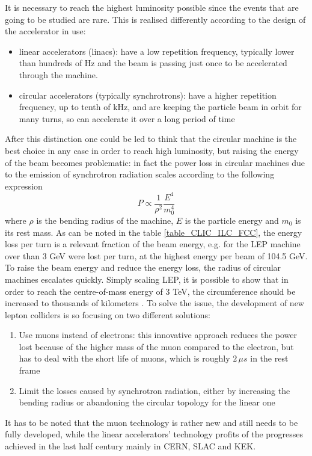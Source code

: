 It is necessary to reach the highest luminosity possible since the events that are going to be studied are rare. This is realised differently according to the design of the accelerator in use:
\begin{itemize}
\item linear accelerators (linacs): have a low repetition frequency, typically lower than hundreds of Hz and the beam is passing just once to be accelerated through the machine.
\item circular accelerators (typically synchrotrons): have a higher repetition frequency, up to tenth of kHz, and are keeping the particle beam in orbit for many turns, so can accelerate it over a long period of time
\end{itemize}
After this distinction one could be led to think that the circular machine is the best choice in any case in order to reach high luminosity, but raising the energy of the beam becomes problematic: in fact the power loss in circular machines due to the emission of synchrotron radiation scales according to the following expression
\begin{equation}
P \propto \frac{1}{\rho^2} \frac{E^4}{m_0^4}
\end{equation}
where $\rho$ is the bending radius of the machine, $E$ is the particle energy and $m_0$ is its rest mass. As can be noted in the table \ref{table_CLIC_ILC_FCC}, the energy loss per turn is a relevant fraction of the beam energy, e.g. for the LEP machine over than 3 GeV were lost per turn, at the highest  energy per beam of 104.5 GeV. To raise the beam energy and reduce the energy loss, the radius of circular machines escalates quickly. Simply scaling LEP, it is possible to show that in order to reach the centre-of-mass energy of 3 TeV, the circumference should be increased to thousands of kilometers \cite{nature:CLIC}.
To solve the issue, the development of new lepton colliders is so focusing on two different solutions:
\begin{enumerate}
\item Use muons instead of electrons: this innovative approach reduces the power lost because of the higher mass of the muon compared to the electron, but has to deal with the short life of muons, which is roughly $2 \, \mu s$ in the rest frame
\item Limit the losses caused by synchrotron radiation, either by increasing the bending radius or abandoning the circular topology for the linear one
\end{enumerate}
It has to be noted that the muon technology is rather new and still needs to be fully developed, while the linear accelerators' technology profits of the progresses achieved in the last half century mainly in CERN, SLAC and KEK.

